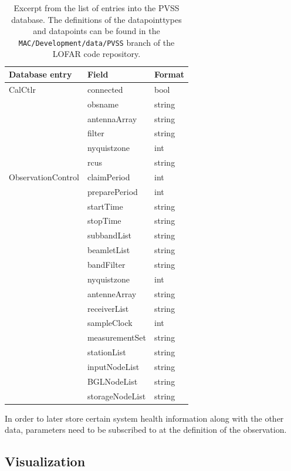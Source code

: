 \documentclass[a4paper,10pt,bibtotoc]{scrartcl}
\begin{document}
\begin{table}[htb]
  \centering
  \begin{tabular}{|lll|}
    \hline
    \sc Database entry & \sc Field & \sc Format \\
    \hline \hline
    CalCtlr & connected    & bool \\
            & obsname      & string \\
            & antennaArray & string \\
            & filter       & string \\
            & nyquistzone  & int \\
            & rcus         & string \\
    \hline
    ObservationControl & claimPeriod & int \\
    & preparePeriod   & int \\
    & startTime       & string \\
    & stopTime        & string \\
    & subbandList     & string \\
    & beamletList     & string \\
    & bandFilter      & string \\
    & nyquistzone     & int \\
    & antenneArray    & string \\
    & receiverList    & string \\
    & sampleClock     & int \\
    & measurementSet  & string \\
    & stationList     & string \\
    & inputNodeList   & string \\
    & BGLNodeList     & string \\
    & storageNodeList & string \\
    \hline
  \end{tabular}
  \caption{Excerpt from the list of entries into the PVSS database. The
    definitions of the datapointtypes and datapoints can be found in the
    \texttt{MAC/Development/data/PVSS} branch of the LOFAR code repository.}
  \label{tab:PVSS}
\end{table}

In order to later store certain system health information along with the other
data, parameters need to be subscribed to at the definition of the observation.

\subsection{Visualization}
\end{document}
